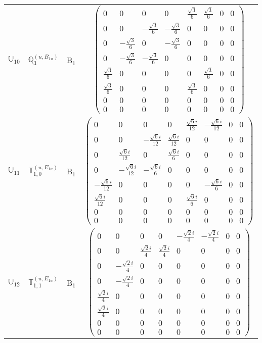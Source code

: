 \documentclass[fleqn,10pt,landscape]{article}
\begin{document}
\begin{itemize}
\begin{center}
\begin{longtable}{c|c|c|c}
$ \mathbb{U}_{10} $ & $\mathbb{Q}_{3}^{(u,B_{1u})}$ & B$_{1}$ & $\begin{pmatrix} 0 & 0 & 0 & 0 & \frac{\sqrt{3}}{6} & \frac{\sqrt{3}}{6} & 0 & 0 \\ 0 & 0 & - \frac{\sqrt{3}}{6} & - \frac{\sqrt{3}}{6} & 0 & 0 & 0 & 0 \\ 0 & - \frac{\sqrt{3}}{6} & 0 & - \frac{\sqrt{3}}{6} & 0 & 0 & 0 & 0 \\ 0 & - \frac{\sqrt{3}}{6} & - \frac{\sqrt{3}}{6} & 0 & 0 & 0 & 0 & 0 \\ \frac{\sqrt{3}}{6} & 0 & 0 & 0 & 0 & \frac{\sqrt{3}}{6} & 0 & 0 \\ \frac{\sqrt{3}}{6} & 0 & 0 & 0 & \frac{\sqrt{3}}{6} & 0 & 0 & 0 \\ 0 & 0 & 0 & 0 & 0 & 0 & 0 & 0 \\ 0 & 0 & 0 & 0 & 0 & 0 & 0 & 0 \end{pmatrix}$ \\
$ \mathbb{U}_{11} $ & $\mathbb{T}_{1,0}^{(u,E_{1u})}$ & B$_{1}$ & $\begin{pmatrix} 0 & 0 & 0 & 0 & \frac{\sqrt{6} i}{12} & - \frac{\sqrt{6} i}{12} & 0 & 0 \\ 0 & 0 & - \frac{\sqrt{6} i}{12} & \frac{\sqrt{6} i}{12} & 0 & 0 & 0 & 0 \\ 0 & \frac{\sqrt{6} i}{12} & 0 & \frac{\sqrt{6} i}{6} & 0 & 0 & 0 & 0 \\ 0 & - \frac{\sqrt{6} i}{12} & - \frac{\sqrt{6} i}{6} & 0 & 0 & 0 & 0 & 0 \\ - \frac{\sqrt{6} i}{12} & 0 & 0 & 0 & 0 & - \frac{\sqrt{6} i}{6} & 0 & 0 \\ \frac{\sqrt{6} i}{12} & 0 & 0 & 0 & \frac{\sqrt{6} i}{6} & 0 & 0 & 0 \\ 0 & 0 & 0 & 0 & 0 & 0 & 0 & 0 \\ 0 & 0 & 0 & 0 & 0 & 0 & 0 & 0 \end{pmatrix}$ \\
$ \mathbb{U}_{12} $ & $\mathbb{T}_{1,1}^{(u,E_{1u})}$ & B$_{1}$ & $\begin{pmatrix} 0 & 0 & 0 & 0 & - \frac{\sqrt{2} i}{4} & - \frac{\sqrt{2} i}{4} & 0 & 0 \\ 0 & 0 & \frac{\sqrt{2} i}{4} & \frac{\sqrt{2} i}{4} & 0 & 0 & 0 & 0 \\ 0 & - \frac{\sqrt{2} i}{4} & 0 & 0 & 0 & 0 & 0 & 0 \\ 0 & - \frac{\sqrt{2} i}{4} & 0 & 0 & 0 & 0 & 0 & 0 \\ \frac{\sqrt{2} i}{4} & 0 & 0 & 0 & 0 & 0 & 0 & 0 \\ \frac{\sqrt{2} i}{4} & 0 & 0 & 0 & 0 & 0 & 0 & 0 \\ 0 & 0 & 0 & 0 & 0 & 0 & 0 & 0 \\ 0 & 0 & 0 & 0 & 0 & 0 & 0 & 0 \end{pmatrix}$ \\

\end{longtable}
\end{center}
\end{itemize}
\end{document}
